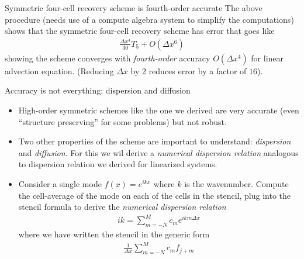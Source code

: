 \documentclass[aspectratio=169]{beamer}
\newcommand{\mypause}{}
\begin{document}
\begin{frame}{Symmetric four-cell recovery scheme is fourth-order
    accurate}
  The above procedure (needs use of a compute algebra system to
  simplify the computations) shows that the symmetric four-cell
  recovery scheme has error that goes like
  \begin{align*}
      \frac{\Delta x^4}{30} T_5 + O(\Delta x^6)
  \end{align*}
  showing the scheme converges with \emph{fourth-order} accuracy
  $O(\Delta x^4)$ for linear advection equation. (Reducing $\Delta x$
  by 2 reduces error by a factor of $16$).

\end{frame}

\begin{frame}{Accuracy is not everything: dispersion and diffusion}
  \footnotesize
  \begin{itemize}
  \item High-order symmetric schemes like the one we derived are very
    accurate (even ``structure preserving'' for some problems) but not
    robust.
    \mypause%
  \item Two other properties of the scheme are important to
    understand: \emph{dispersion} and \emph{diffusion}. For this we
    wil derive a \emph{numerical dispersion relation} analogous to
    dispersion relation we derived for linearized systems.
    \mypause%
  \item Consider a single mode $f(x) = e^{ik x}$ where $k$ is the
    wavenumber. Compute the cell-average of the mode on each of the
    cells in the stencil, plug into the stencil formula to derive the
    \emph{numerical dispersion relation}
    \begin{align*}
      i\overline{k} = \sum_{m=-N}^{M} c_m e^{i k m \Delta x}
    \end{align*}
    where we have written the stencil in the generic form
    \begin{align*}
      \frac{1}{\Delta x}\sum_{m = -N}^{M} c_m f_{j+m}
    \end{align*}

  \end{itemize}
\end{frame}
\end{document}
